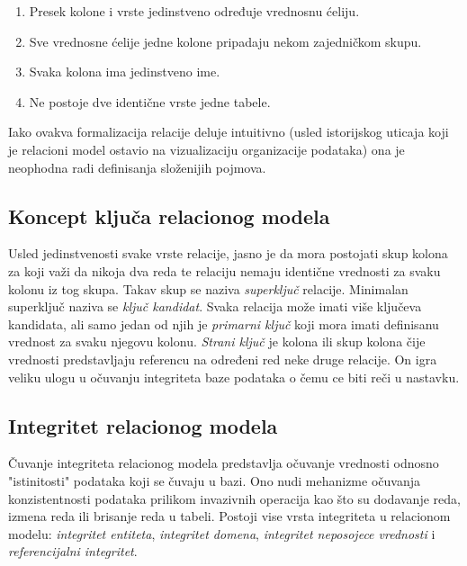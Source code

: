 \documentclass[12pt,oneside]{memoir}
\begin{document}
\begin{enumerate}
\item[\textbullet] Presek kolone i vrste jedinstveno određuje vrednosnu ćeliju.

\item[\textbullet] Sve vrednosne ćelije jedne kolone pripadaju nekom zajedničkom skupu. 

\item[\textbullet] Svaka kolona ima jedinstveno ime.

\item[\textbullet] Ne postoje dve identične vrste jedne tabele. 
\end{enumerate}

Iako ovakva formalizacija relacije deluje intuitivno (usled istorijskog uticaja koji je relacioni model ostavio na vizualizaciju organizacije podataka) ona je neophodna radi definisanja složenijih pojmova. 

\subsection{Koncept ključa relacionog modela}

Usled jedinstvenosti svake vrste relacije, jasno je da mora postojati skup kolona za koji važi da nikoja dva reda te relaciju nemaju identične vrednosti za svaku kolonu iz tog skupa. Takav skup se naziva \textit{superključ} relacije. Minimalan superključ naziva se \textit{ključ kandidat}. Svaka relacija može imati više ključeva kandidata, ali samo jedan od njih je  \textit{primarni ključ} koji mora imati definisanu vrednost za svaku njegovu kolonu.
\textit{Strani ključ} je kolona ili skup kolona čije vrednosti predstavljaju referencu na određeni red neke druge relacije. On igra veliku ulogu u očuvanju integriteta baze podataka o čemu ce biti reči u nastavku.

\subsection{Integritet relacionog modela}
Čuvanje integriteta relacionog modela predstavlja očuvanje vrednosti odnosno "istinitosti"  podataka koji se čuvaju u bazi. Ono nudi mehanizme očuvanja konzistentnosti podataka prilikom invazivnih operacija kao što su dodavanje reda, izmena reda ili brisanje reda u tabeli. Postoji vise vrsta integriteta u relacionom modelu: \textit{integritet entiteta}, \textit{integritet domena}, \textit{integritet neposojece vrednosti} i \textit{referencijalni integritet}.
\end{document}

